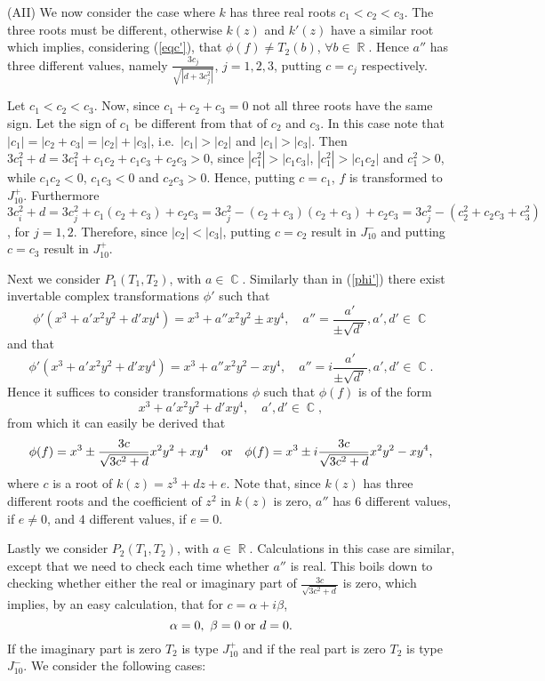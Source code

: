 \documentclass[noend]{amsproc}
\theoremstyle{definition}
\DeclareMathOperator{\R}{\mathbb{R}}
\DeclareMathOperator{\C}{\mathbb{C}}
\begin{document}
(AII) We now consider the case where $k$ has three real roots $c_1<c_2<c_3$.
The three roots must be different, otherwise $k(z)$ and $k'(z)$ have a similar
root which implies, considering (\ref{eqc'}), that $\phi(f)\neq T_2(b)$,
$\forall b\in\R$. Hence $a''$ has three different values, namely
$\frac{3c_j}{\sqrt{|d+3c_j^2|}}$, $j=1,2,3$, putting $c=c_j$ respectively.

Let $c_1<c_2<c_3$. Now, since $c_1+c_2+c_3=0$ not all three roots have the same
sign. Let the sign of $c_1$ be different from that of $c_2$ and $c_3$. In this
case note that $|c_1|=|c_2+c_3|=|c_2|+|c_3|$, i.e.~$|c_1|>|c_2|$ and
$|c_1|>|c_3|$. Then $3c_1^2+d=3c_1^2+c_1c_2+c_1c_3+c_2c_3>0$, since
$|c_1^2|>|c_1c_3|$, $|c_1^2|>|c_1c_2|$ and $c_1^2>0$, while $c_1c_2<0$,
$c_1c_3<0$ and $c_2c_3>0$. Hence, putting $c=c_1$, $f$ is transformed to
$J_{10}^+$.
Furthermore
$3c_i^2+d=3c_j^2+c_1(c_2+c_3)+c_2c_3=3c_j^2-(c_2+c_3)(c_2+c_3)+c_2c_3
=3c_j^2-(c_2^2+c_2c_3+c_3^2)$,
for $j=1,2$. Therefore, since $|c_2|<|c_3|$, putting $c=c_2$ result in
$J_{10}^-$ and putting $c=c_3$ result in $J_{10}^+$.

Next we consider $P_1(T_1,T_2)$, with $a\in\C$. Similarly than in (\ref{phi'})
there exist invertable complex transformations $\phi'$ such that
\begin{equation}
\phi'(x^3+a'x^2y^2+d'xy^4)=x^3+a''x^2y^2\pm xy^4,\quad
a''=\frac{a'}{\pm\sqrt{d'}}, a',d'\in\C
\end{equation}
and that
\begin{equation}
\phi'(x^3+a'x^2y^2+d'xy^4)=x^3+a''x^2y^2-xy^4,\quad
a''=i\frac{a'}{\pm\sqrt{d'}}, a', d'\in\C.
\end{equation}
Hence it suffices to consider transformations $\phi$ such that $\phi(f)$ is of
the form
\begin{equation}
x^3+a'x^2y^2+d'xy^4,\quad a',d'\in\C,
\end{equation}
from which it can easily be derived that
\begin{equation}\label{eqc'1}
\phi(f)=x^3\pm\frac{3c}{\sqrt{3{c}^2+d}}x^2y^2+xy^4\quad\textnormal{or}\quad
\phi(f)=x^3\pm i\frac{3c}{\sqrt{3{c}^2+d}}x^2y^2-xy^4,
\end{equation}
where $c$ is a root of $k(z)=z^3+dz+e$. Note that, since $k(z)$ has three
different roots and the coefficient of $z^2$ in $k(z)$ is zero, $a''$ has $6$
different values, if $e\neq 0$, and $4$ different values, if $e=0$.

Lastly we consider $P_2(T_1,T_2)$, with $a\in\R$. Calculations in this case are
similar, except that we need to check each time whether $a''$ is real. This
boils down to checking whether either the real or imaginary part of
$\frac{3c}{\sqrt{3{c}^2+d}}$ is zero, which implies, by an easy calculation,
that for
$c=\alpha +i\beta$,
\begin{equation}\label{eqd}
\alpha=0,\ \beta=0\textnormal{ or }d=0.
\end{equation}
If the imaginary part is zero $T_2$ is type $J_{10}^+$ and if the real part is
zero $T_2$ is type $J_{10}^-$.
We consider the following cases:
\end{document}

